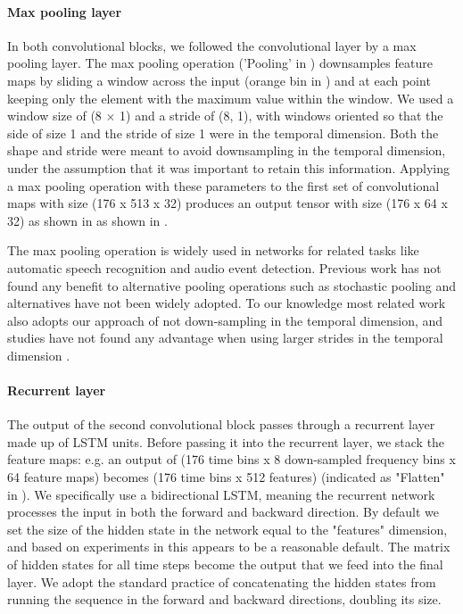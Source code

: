 \documentclass[9pt,lineno]{elife}
\begin{document}
\paragraph{Max pooling layer}
In both convolutional blocks, we followed the convolutional layer 
by a max pooling layer. 
The max pooling operation ('Pooling' in ) 
downsamples feature maps by sliding a window across the input 
(orange bin in ) and at each point 
keeping only the element with the maximum value within the window. 
We used a window size of (8 $\times$ 1) and a stride of (8, 1), 
with windows oriented so 
that the side of size 1 and the stride of size 1 were in the temporal dimension. 
Both the shape and stride were meant to avoid downsampling 
in the temporal dimension, under the assumption 
that it was important to retain this information.
Applying a max pooling operation with these parameters to 
the first set of convolutional maps with size (176 x 513 x 32) 
produces an output tensor with size (176 x 64 x 32) 
as shown in as shown in .

The max pooling operation is widely used in networks for related tasks 
like automatic speech recognition and audio event detection.  
Previous work has not found any benefit to alternative pooling operations 
such as stochastic pooling \citep{sainath2013improvements} 
and alternatives have not been widely adopted.
To our knowledge most related work also adopts our approach 
of not down-sampling in the temporal dimension, 
and studies have not found any advantage 
when using larger strides in the temporal dimension \citep{sainath2013improvements}.

\paragraph{Recurrent layer}
The output of the second convolutional block passes through a recurrent layer made up of LSTM units. 
Before passing it into the recurrent layer, 
we stack the feature maps: 
e.g. an output of (176 time bins x 8 down-sampled frequency bins x 64 feature maps) 
becomes (176 time bins x 512 features)
(indicated as "Flatten" in ).
We specifically use a bidirectional LSTM, 
meaning the recurrent network processes the input in both the forward and backward direction. 
By default we set the size of the hidden state in the network 
equal to the "features" dimension, 
and based on experiments in  
this appears to be a reasonable default. 
The matrix of hidden states for all time steps become the output 
that we feed into the final layer.
We adopt the standard practice 
of concatenating the hidden states 
from running the sequence in the forward and backward directions, 
doubling its size.
\end{document}
